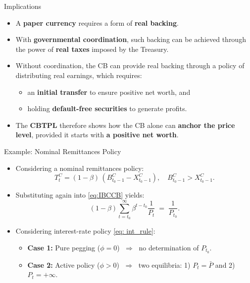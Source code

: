 \documentclass[11pt,aspectratio=169]{beamer}
\begin{document}
\begin{frame}{Implications}


\begin{itemize}
  \item A \textbf{paper currency} requires a form of \textbf{real backing}.
  
  \vspace{0.2cm}
  \item With \textbf{governmental coordination}, such backing can be achieved through the power of \textbf{real taxes} imposed by the Treasury.
  
  \vspace{0.2cm}
  \item Without coordination, the CB can provide real backing through a policy of distributing real earnings, which requires:
  \begin{itemize}
    \item an \textbf{initial transfer} to ensure positive net worth, and  
    \item holding \textbf{default-free securities} to generate profits.  
  \end{itemize}
  
  \vspace{0.2cm}
  \item The \textbf{CBTPL} therefore shows how the CB alone can \textbf{anchor the price level}, provided it starts with \textbf{a positive net worth}.
\end{itemize}

\end{frame}


\begin{frame}{Example: Nominal Remittances Policy}
\begin{itemize}
    \item Considering a nominal remittances policy:
    \[
      T_t^C = (1-\beta)\,(B_{t_0-1}^C - X_{t_0-1}^C), \quad B_{t_0-1}^C > X_{t_0-1}^C.
    \]
    \vspace{0.15cm}
    \item Substituting again into \eqref{eq:IBCCB} yields:
    \begin{equation} \label{eq: nominal remittancy}
      (1-\beta)\sum_{t=t_0}^\infty \beta^{t-t_0}\frac{1}{P_t} \;=\; \frac{1}{P_{t_0}}.
    \end{equation}
    \vspace{0.15cm}
    \item Considering interest-rate policy \eqref{eq: int_rule}:
    \begin{itemize}
        \item \textbf{Case 1:} Pure pegging ($\phi=0$) $\;\Rightarrow\;$ no determination of $P_{t_0}$.  
        \item \textbf{Case 2:} Active policy ($\phi>0$) $\;\Rightarrow\;$ two equilibria: 1) $P_t=\bar P$ and 2) $P_t=+\infty$.  
    \end{itemize}
\end{itemize}
\end{frame}
\end{document}
